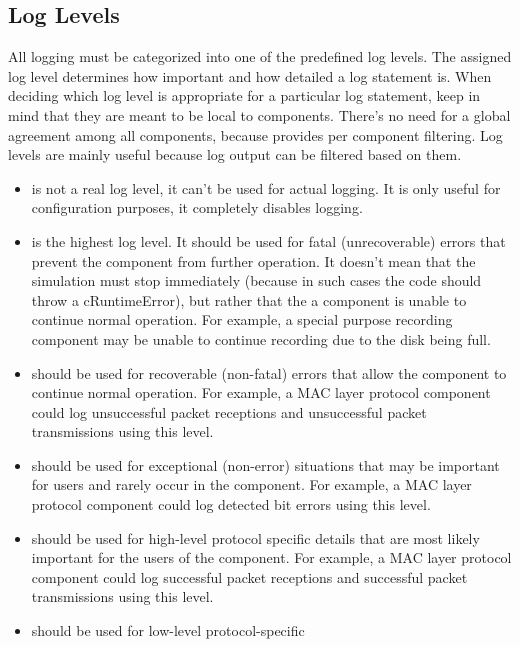 \subsection{Log Levels}
\label{sec:sim-lib:log-levels}

All logging must be categorized into one of the predefined log levels. The
assigned log level determines how important and how detailed a log statement
is. When deciding which log level is appropriate for a particular log statement,
keep in mind that they are meant to be local to components. There's no need for
a global agreement among all components, because {\opp} provides per component
filtering. Log levels are mainly useful because log output can be filtered
based on them.

\begin{itemize}
  \item {} is not a real log level, it can't be used for actual
    logging. It is only useful for configuration purposes, it completely disables
    logging.
  \item {} is the highest log level. It should be used for
    fatal (unrecoverable) errors that prevent the component from further
    operation. It doesn't mean that the simulation must stop immediately
    (because in such cases the code should throw a cRuntimeError), but rather
    that the a component is unable to continue normal operation. For example, a
    special purpose recording component may be unable to continue recording due
    to the disk being full.
  \item {} should be used for recoverable (non-fatal)
    errors that allow the component to continue normal operation. For example,
    a MAC layer protocol component could log unsuccessful packet receptions and
    unsuccessful packet transmissions using this level.
  \item {} should be used for exceptional (non-error)
    situations that may be important for users and rarely occur in the
    component. For example, a MAC layer protocol component could log detected
    bit errors using this level.
  \item {} should be used for high-level protocol specific
    details that are most likely important for the users of the component. For
    example, a MAC layer protocol component could log successful packet
    receptions and successful packet transmissions using this level.
  \item {} should be used for low-level protocol-specific

\end{itemize}
